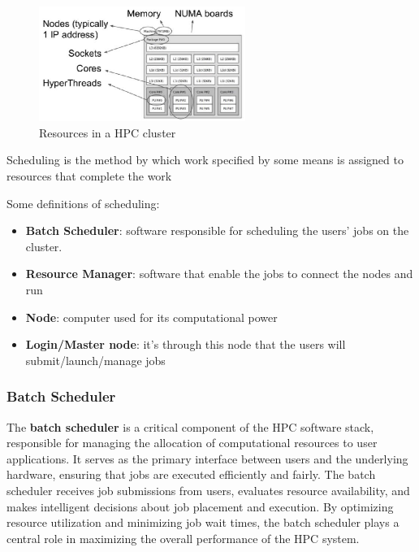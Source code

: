 \begin{figure}[H]
    \centering
    \includegraphics[width=0.6\textwidth]{assets/resources.png}
    \caption{Resources in a HPC cluster}
    \label{fig:resources}
\end{figure}

\begin{definitionblock}[Scheduling]
    Scheduling is the method by which work specified by some means is assigned to resources that complete the work
\end{definitionblock}

Some definitions of scheduling:

\begin{itemize}
    \item \textbf{Batch Scheduler}: software responsible for scheduling the users' jobs on the cluster.
    \item \textbf{Resource Manager}: software that enable the jobs to connect the nodes and run
    \item \textbf{Node}: computer used for its computational power
    \item \textbf{Login/Master node}: it's through this node that the users will submit/launch/manage jobs
\end{itemize}

\subsubsection{Batch Scheduler}

The \textbf{batch scheduler} is a critical component of the HPC software stack, responsible for managing the allocation of computational resources to user applications. It serves as the primary interface between users and the underlying hardware, ensuring that jobs are executed efficiently and fairly. The batch scheduler receives job submissions from users, evaluates resource availability, and makes intelligent decisions about job placement and execution. By optimizing resource utilization and minimizing job wait times, the batch scheduler plays a central role in maximizing the overall performance of the HPC system.

